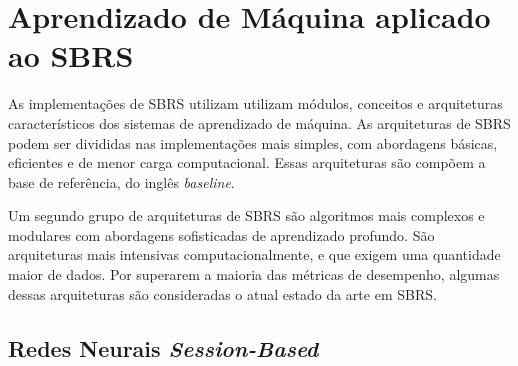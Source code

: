 





\section{Aprendizado de Máquina aplicado ao SBRS}

As implementações de SBRS utilizam utilizam módulos, conceitos e arquiteturas
característicos dos sistemas de aprendizado de máquina. As arquiteturas de SBRS
podem ser divididas nas implementações mais simples, com abordagens básicas,
eficientes e de menor carga computacional. Essas arquiteturas são compõem a base de referência, do inglês
\textit{baseline}.

Um segundo grupo de arquiteturas de SBRS são algoritmos mais complexos e
modulares com abordagens sofisticadas de aprendizado profundo. São arquiteturas
mais intensivas computacionalmente, e que exigem uma quantidade maior de dados.
Por superarem a maioria das métricas de desempenho, algumas dessas arquiteturas
são consideradas o atual estado da arte em SBRS.

\subsection{Redes Neurais \textit{Session-Based}}
